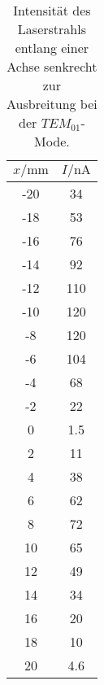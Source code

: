 \begin{table}
    \centering
    \caption{Intensität des Laserstrahls entlang einer Achse senkrecht zur Ausbreitung bei der $TEM_{01}$-Mode.}
    \label{tab:mode01_data}
    \begin{tabular}{c c}
        \toprule
        $x/\si{\milli\meter}$ & $I/\si{\nano\ampere} $ \\
        \midrule
        -20& 34\\
        -18& 53\\
        -16& 76\\
        -14& 92\\
        -12& 110\\
        -10& 120\\
        -8 & 120\\
        -6 & 104\\
        -4 & 68\\
        -2 & 22\\
        0  & 1.5\\
        2  & 11\\
        4  & 38\\
        6  & 62\\
        8  & 72\\
        10 & 65\\
        12 & 49\\
        14 & 34\\
        16 & 20\\
        18 & 10\\
        20 & 4.6\\
        \bottomrule
    \end{tabular}
\end{table}
